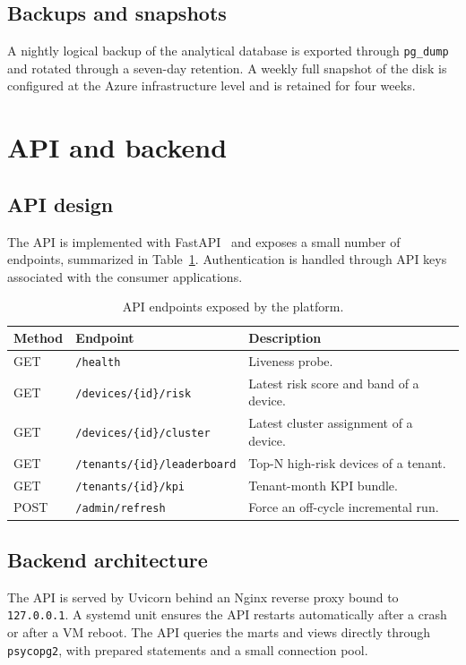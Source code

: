 \subsection{Backups and snapshots}
A nightly logical backup of the analytical database is exported through \texttt{pg\_dump} and rotated through a seven-day retention. A weekly full snapshot of the disk is configured at the Azure infrastructure level and is retained for four weeks.

\section{API and backend}

\subsection{API design}
The API is implemented with FastAPI~\cite{fastapi2024} and exposes a small number of endpoints, summarized in Table~\ref{tab:api-endpoints}. Authentication is handled through API keys associated with the consumer applications.

\begin{table}[h]
\centering
\caption{API endpoints exposed by the platform.}
\label{tab:api-endpoints}
\begin{tabular}{|l|l|p{6.5cm}|}
\hline
\textbf{Method} & \textbf{Endpoint} & \textbf{Description} \\
\hline
GET & \texttt{/health}                            & Liveness probe. \\
GET & \texttt{/devices/\{id\}/risk}               & Latest risk score and band of a device. \\
GET & \texttt{/devices/\{id\}/cluster}            & Latest cluster assignment of a device. \\
GET & \texttt{/tenants/\{id\}/leaderboard}        & Top-N high-risk devices of a tenant. \\
GET & \texttt{/tenants/\{id\}/kpi}                & Tenant-month KPI bundle. \\
POST& \texttt{/admin/refresh}                     & Force an off-cycle incremental run. \\
\hline
\end{tabular}
\end{table}

\subsection{Backend architecture}
The API is served by Uvicorn behind an Nginx reverse proxy bound to \texttt{127.0.0.1}. A systemd unit ensures the API restarts automatically after a crash or after a VM reboot. The API queries the marts and views directly through \texttt{psycopg2}, with prepared statements and a small connection pool.

